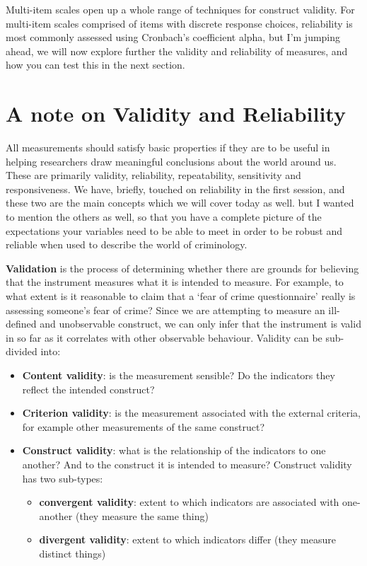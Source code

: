 \documentclass[
]{book}
\providecommand{\tightlist}{%
  \setlength{\itemsep}{0pt}\setlength{\parskip}{0pt}}
\begin{document}
Multi-item scales open up a whole range of techniques for construct validity. For multi-item scales comprised of items with discrete response choices, reliability is most commonly assessed using Cronbach's coefficient alpha, but I'm jumping ahead, we will now explore further the validity and reliability of measures, and how you can test this in the next section.

\hypertarget{a-note-on-validity-and-reliability}{%
\section{A note on Validity and Reliability}\label{a-note-on-validity-and-reliability}}

All measurements should satisfy basic properties if they are to be useful in helping researchers draw meaningful conclusions about the world around us. These are primarily validity, reliability, repeatability, sensitivity and responsiveness. We have, briefly, touched on reliability in the first session, and these two are the main concepts which we will cover today as well. but I wanted to mention the others as well, so that you have a complete picture of the expectations your variables need to be able to meet in order to be robust and reliable when used to describe the world of criminology.

\textbf{Validation} is the process of determining whether there are grounds for believing that the instrument measures what it is intended to measure. For example, to what extent is it reasonable to claim that a `fear of crime questionnaire' really is assessing someone's fear of crime? Since we are attempting to measure an ill-defined and unobservable construct, we can only infer that the instrument is valid in so far as it correlates with other observable behaviour. Validity can be sub-divided into:

\begin{itemize}
\tightlist
\item
  \textbf{Content validity}: is the measurement sensible? Do the indicators they reflect the intended construct?
\item
  \textbf{Criterion validity}: is the measurement associated with the external criteria, for example other measurements of the same construct?
\item
  \textbf{Construct validity}: what is the relationship of the indicators to one another? And to the construct it is intended to measure? Construct validity has two sub-types:

  \begin{itemize}
  \tightlist
  \item
    \textbf{convergent validity}: extent to which indicators are associated with one-another (they measure the same thing)
  \item
    \textbf{divergent validity}: extent to which indicators differ (they measure distinct things)
  \end{itemize}
\end{itemize}
\end{document}
